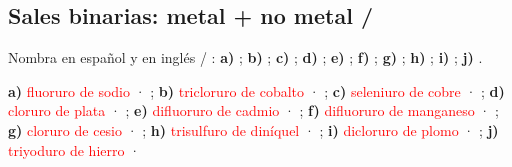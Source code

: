 \subsection{Sales binarias: metal + no metal / }

\begin{exercise}
    Nombra en español y en inglés / : \textbf{a)} ; \textbf{b)} ; \textbf{c)} ; \textbf{d)} ; \textbf{e)} ; \textbf{f)} ; \textbf{g)} ; \textbf{h)} ; \textbf{i)} ; \textbf{j)} .
    \begin{solu}
        \textbf{a)} \textcolor{red}{fluoruro de sodio} · \textcolor{red}{}; \textbf{b)} \textcolor{red}{tricloruro de cobalto} · \textcolor{red}{}; \textbf{c)} \textcolor{red}{seleniuro de cobre} · \textcolor{red}{}; \textbf{d)} \textcolor{red}{cloruro de plata} · \textcolor{red}{}; \textbf{e)} \textcolor{red}{difluoruro de cadmio} · \textcolor{red}{}; \textbf{f)} \textcolor{red}{difluoruro de manganeso} · \textcolor{red}{}; \textbf{g)} \textcolor{red}{cloruro de cesio} · \textcolor{red}{}; \textbf{h)} \textcolor{red}{trisulfuro de diníquel} · \textcolor{red}{}; \textbf{i)} \textcolor{red}{dicloruro de plomo} · \textcolor{red}{}; \textbf{j)} \textcolor{red}{triyoduro de hierro} · \textcolor{red}{}
    \end{solu}
\end{exercise}

